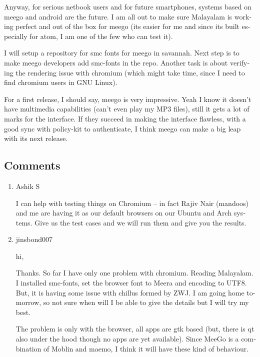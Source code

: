 \begin{english}
Anyway, for serious netbook users and for future smartphones, systems based on meego and android are the 
future. I am all out to make sure Malayalam is working perfect and out of the box for meego (its easier 
for me and since its built especially for atom, I am one of the few who can test it).

I will setup a repository for smc fonts for meego in savannah. Next step is to make meego developers add smc-fonts 
in the repo. Another task is about verifying the rendering issue with chromium (which might take time, since I need to 
find chromium users in GNU Linux).

For a first release, I should say, meego is very impressive. Yeah I know it doesn't have multimedia capabilities (can't even 
play my MP3 files), still it gets a lot of marks for the interface. If they succeed in making the interface flawless, 
with a good sync with policy-kit to authenticate, I think meego can make a big leap with its next release.


\subsection*{Comments}
\begin{enumerate}
 \item{Ashik S}
 
I can help with testing things on Chromium – in fact Rajiv Nair (mandoos) and me are having it as our default browsers on 
our Ubuntu and Arch systems. Give us the test cases and we will run them and give you the results.

 \item{jinsbond007}
 
hi,

Thanks. So far I have only one problem with chromium. Reading Malayalam.
I installed smc-fonts, set the browser font to Meera and encoding to UTF8. But, it is having some issue with chillus 
formed by ZWJ.
I am going home tomorrow, so not sure when will I be able to give the details but I will try my best. 

The problem is only with the browser, all apps are gtk based (but, there is qt also under the hood though no apps 
are yet available). Since MeeGo is a combination of Moblin and maemo, I think it will have these kind of behaviour. 

\end{enumerate}
\end{english}
\newpage 
